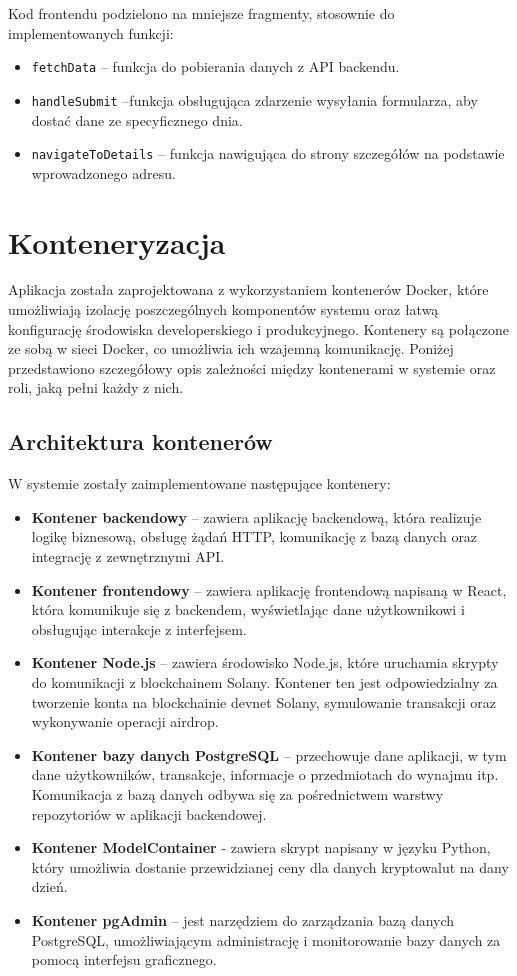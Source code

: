 Kod frontendu podzielono na mniejsze fragmenty, stosownie do implementowanych funkcji:
\begin{itemize}
    \item \texttt{fetchData} -- funkcja do pobierania danych z API backendu.
    \item \texttt{handleSubmit} --funkcja obsługująca zdarzenie wysyłania formularza, aby dostać dane ze specyficznego dnia.
    \item \texttt{navigateToDetails} -- funkcja nawigująca do strony szczegółów na podstawie wprowadzonego adresu.
\end{itemize}




\section{Konteneryzacja}
Aplikacja została zaprojektowana z wykorzystaniem kontenerów Docker, które umożliwiają izolację poszczególnych komponentów systemu oraz łatwą konfigurację środowiska developerskiego i produkcyjnego. Kontenery są połączone ze sobą w sieci Docker, co umożliwia ich wzajemną komunikację. Poniżej przedstawiono szczegółowy opis zależności między kontenerami w systemie oraz roli, jaką pełni każdy z nich.

\subsection{Architektura kontenerów}
W systemie zostały zaimplementowane następujące kontenery:
\begin{itemize}
    \item \textbf{Kontener backendowy} – zawiera aplikację backendową, która realizuje logikę biznesową, obsługę żądań HTTP, komunikację z bazą danych oraz integrację z zewnętrznymi API.
    \item \textbf{Kontener frontendowy} – zawiera aplikację frontendową napisaną w React, która komunikuje się z backendem, wyświetlając dane użytkownikowi i obsługując interakcje z interfejsem.
    \item \textbf{Kontener Node.js} – zawiera środowisko Node.js, które uruchamia skrypty do komunikacji z blockchainem Solany. Kontener ten jest odpowiedzialny za tworzenie konta na blockchainie devnet Solany, symulowanie transakcji oraz wykonywanie operacji airdrop.
    \item \textbf{Kontener bazy danych PostgreSQL} – przechowuje dane aplikacji, w tym dane użytkowników, transakcje, informacje o przedmiotach do wynajmu itp. Komunikacja z bazą danych odbywa się za pośrednictwem warstwy repozytoriów w aplikacji backendowej.
		\item \textbf{Kontener ModelContainer} - zawiera skrypt napisany w języku Python, który umożliwia dostanie przewidzianej ceny dla danych kryptowalut na dany dzień.
    \item \textbf{Kontener pgAdmin} – jest narzędziem do zarządzania bazą danych PostgreSQL, umożliwiającym administrację i monitorowanie bazy danych za pomocą interfejsu graficznego.
\end{itemize}

